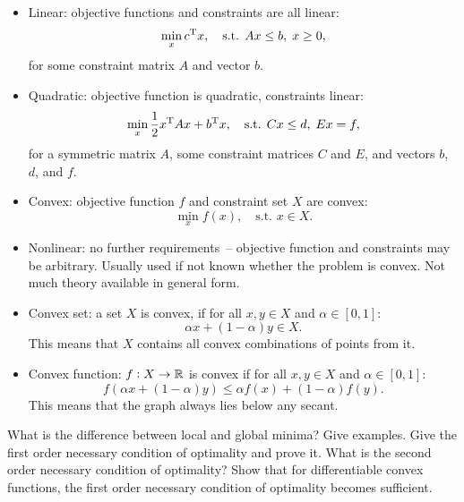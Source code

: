 \documentclass{article}
\begin{document}
\begin{itemize}
\item Linear: objective functions and constraints are all linear:
  \begin{equation*}
    \min_x c^{\mathrm{T}} x, \quad\text{s.t. } Ax \leq b,\; x \geq 0,
  \end{equation*}
  for some constraint matrix \(A\) and vector \(b\).
\item Quadratic: objective function is quadratic, constraints linear:
  \begin{equation*}
    \min_x \frac{1}{2}x^{\mathrm{T}} A x + b^{\mathrm{T}} x, \quad\text{s.t. } Cx \leq d, \; Ex = f,
  \end{equation*}
  for a symmetric matrix \(A\), some constraint matrices \(C\) and \(E\), and vectors \(b\), \(d\),
  and \(f\).
\item Convex: objective function \(f\) and constraint set \(X\) are convex:
  \begin{equation*}
    \min_x f(x), \quad\text{s.t. } x \in X.
  \end{equation*}
\item Nonlinear: no further requirements~-- objective function and constraints may be
  arbitrary.  Usually used if not known whether the problem is convex.  Not much theory available in
  general form.
\item Convex set: a set \(X\) is convex, if for all \(x, y \in X\) and
  \(\alpha \in [0,1]\):
  \begin{equation*}
    \alpha x + (1 - \alpha) y \in X.
  \end{equation*}
  This means that \(X\) contains all convex combinations of points from it.
\item Convex function: \(f: X \to \mathbb{R}\) is convex if for all \(x, y \in X\) and
  \(\alpha \in [0,1]\):
  \begin{equation*}
    f(\alpha x + (1 - \alpha) y) \leq \alpha f(x) + (1 - \alpha) f(y).
  \end{equation*}
  This means that the graph always lies below any secant.
\end{itemize}

\begin{question}
  What is the difference between local and global minima?  Give examples.  Give the first order
  necessary condition of optimality and prove it. What is the second order necessary condition of
  optimality? Show that for differentiable convex functions, the first order necessary condition of
  optimality becomes sufficient.
\end{question}
\end{document}
